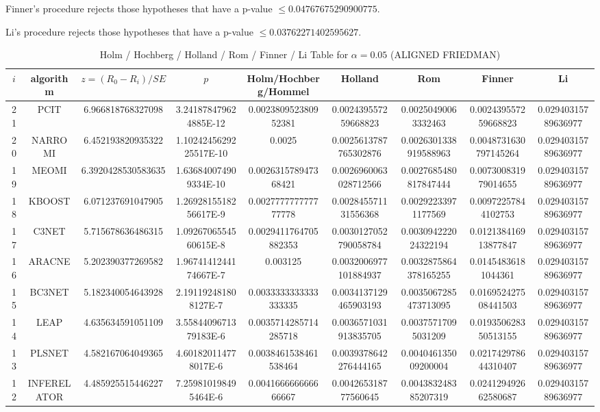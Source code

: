 \documentclass[a4paper,10pt]{article}
\begin{document}
\begin{landscape}
Finner's procedure rejects those hypotheses that have a p-value $\le0.04767675290900775$.


Li's procedure rejects those hypotheses that have a p-value $\le0.03762271402595627$.



\newpage

\begin{table}[!htp]
\centering\scriptsize
\caption{Holm / Hochberg / Holland / Rom / Finner / Li Table for $\alpha=0.05$ (ALIGNED FRIEDMAN)}
\begin{tabular}{ccccccccc}
$i$&algorithm&$z=(R_0 - R_i)/SE$&$p$&Holm/Hochberg/Hommel&Holland&Rom&Finner&Li\\
\hline
21&PCIT&6.966818768327098&3.241878479624885E-12&0.002380952380952381&0.002439557259668823&0.00250490063332463&0.002439557259668823&0.02940315789636977\\
20&NARROMI&6.452193820935322&1.1024245629225517E-10&0.0025&0.0025613787765302876&0.0026301338919588963&0.0048731630797145264&0.02940315789636977\\
19&MEOMI&6.3920428530583635&1.636840074909334E-10&0.002631578947368421&0.0026960063028712566&0.0027685480817847444&0.007300831979014655&0.02940315789636977\\
18&KBOOST&6.071237691047905&1.2692815518256617E-9&0.002777777777777778&0.002845571131556368&0.00292233971177569&0.00972257844102753&0.02940315789636977\\
17&C3NET&5.715678636486315&1.0926706554560615E-8&0.0029411764705882353&0.0030127052790058784&0.003094222024322194&0.012138416913877847&0.02940315789636977\\
16&ARACNE&5.202390377269582&1.9674141244174667E-7&0.003125&0.0032006977101884937&0.0032875864378165255&0.01454836181044361&0.02940315789636977\\
15&BC3NET&5.182340054643928&2.191192481808127E-7&0.0033333333333333335&0.0034137129465903193&0.0035067285473713095&0.016952427508441503&0.02940315789636977\\
14&LEAP&4.635634591051109&3.5584409671379183E-6&0.0035714285714285718&0.0036571031913835705&0.00375717095031209&0.019350628350513155&0.02940315789636977\\
13&PLSNET&4.582167064049365&4.601820114778017E-6&0.0038461538461538464&0.0039378642276444165&0.004046135009200004&0.021742978644310407&0.02940315789636977\\
12&INFERELATOR&4.485925515446227&7.259810198495464E-6&0.004166666666666667&0.004265318777560645&0.004383248385207319&0.024129492662580687&0.02940315789636977\\

\end{tabular}
\end{table}
\end{landscape}
\end{document}
